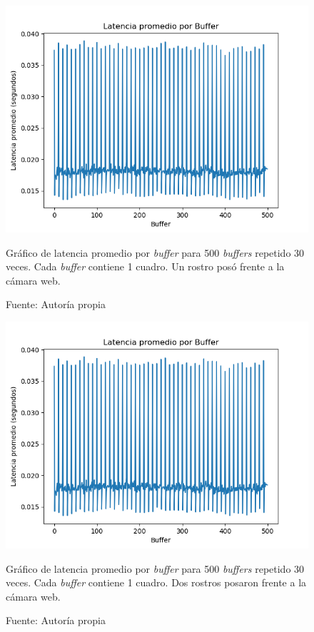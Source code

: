 \documentclass[a4paper,openright,12pt]{report}
\begin{document}
  \begin{figure}[!h]
    \centering
      \includegraphics[width=1.0\textwidth]{../images/latency-cheesefaceoverlay-1-faces.png}\par
    \caption{Gráfico de latencia promedio por \textit{buffer} para 500
             \textit{buffers} repetido 30 veces. Cada \textit{buffer}
             contiene 1 cuadro. Un rostro posó frente a la cámara web.}
      \label{fig:latency-cheesefaceoverlay-1-faces}
    \caption*{Fuente: Autoría propia}
  \end{figure}

  \begin{figure}[!h]
    \centering
      \includegraphics[width=1.0\textwidth]{../images/latency-cheesefaceoverlay-1-faces.png}\par
    \caption{Gráfico de latencia promedio por \textit{buffer} para 500
             \textit{buffers} repetido 30 veces. Cada \textit{buffer} contiene
             1 cuadro. Dos rostros posaron frente a la cámara web.}
      \label{fig:latency-cheesefaceoverlay-1-faces}
    \caption*{Fuente: Autoría propia}
  \end{figure}
\end{document}
